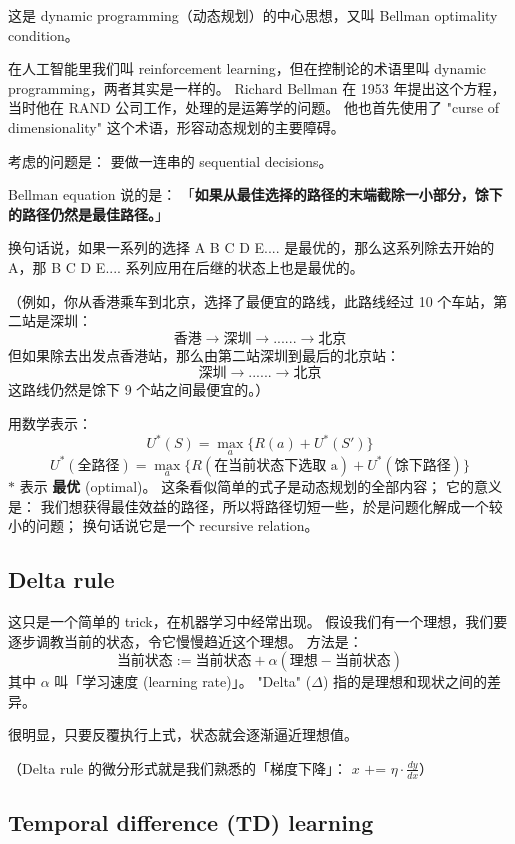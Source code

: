 \documentclass[orivec]{llncs}
\newcommand{\emp}[1]{\textbf{\textcolor{Cerulean}{#1}}}
\begin{document}
这是 dynamic programming（动态规划）的中心思想，又叫 Bellman optimality condition。

在人工智能里我们叫 reinforcement learning，但在控制论的术语里叫 dynamic programming，两者其实是一样的。 Richard Bellman 在 1953 年提出这个方程，当时他在 RAND 公司工作，处理的是运筹学的问题。 他也首先使用了 "curse of dimensionality" 这个术语，形容动态规划的主要障碍。

考虑的问题是： 要做一连串的 sequential decisions。

Bellman equation 说的是： 「\textbf{如果从最佳选择的路径的末端截除一小部分，馀下的路径仍然是最佳路径。}」

换句话说，如果一系列的选择 A B C D E.... 是最优的，那么这系列除去开始的 A，那 B C D E.... 系列应用在后继的状态上也是最优的。

（例如，你从香港乘车到北京，选择了最便宜的路线，此路线经过 10 个车站，第二站是深圳：
$$ \mbox{香港} \rightarrow \mbox{深圳} \rightarrow ... ... \rightarrow \mbox{北京} $$
但如果除去出发点香港站，那么由第二站深圳到最后的北京站：
$$ \mbox{深圳} \rightarrow ... ... \rightarrow \mbox{北京} $$
这路线仍然是馀下 9 个站之间最便宜的。）

用数学表示：
$$ U^*(S) = \max_a \{ R(a) + U^*(S') \} $$
$$ U^*(\mbox{全路径}) = \max_a \{ R(\mbox{在当前状态下选取 a}) + U^*(馀下路径) \} $$
$*$ 表示 \emp{最优} (optimal)。 这条看似简单的式子是动态规划的全部内容； 它的意义是： 我们想获得最佳效益的路径，所以将路径切短一些，於是问题化解成一个较小的问题；  换句话说它是一个 recursive relation。

\subsection{Delta rule}

这只是一个简单的 trick，在机器学习中经常出现。  假设我们有一个理想，我们要逐步调教当前的状态，令它慢慢趋近这个理想。 方法是： 
$$ \mbox{当前状态} := \mbox{当前状态} + \alpha ( \mbox{理想} - \mbox{当前状态}) $$
其中 $\alpha$ 叫「学习速度 (learning rate)」。 "Delta" ($\Delta$) 指的是理想和现状之间的差异。

很明显，只要反覆执行上式，状态就会逐渐逼近理想值。

（Delta rule 的微分形式就是我们熟悉的「梯度下降」： $x \mbox{ += } \eta \cdot \frac{dy}{dx}$）

\subsection{Temporal difference (TD) learning}
\end{document}
